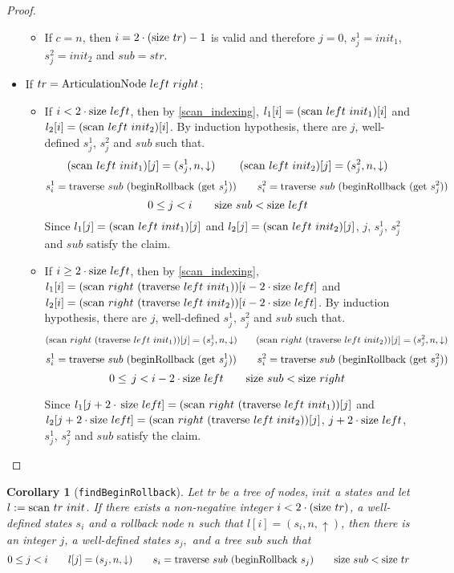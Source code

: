 \documentclass{article}
\newtheorem{corollary}[lemma]{Corollary}
\newcommand{\textfun}[1]{\textup{#1}}
\newcommand{\textcode}[1]{\texttt{#1}}
\newcommand{\artNode}[2]{\textfun{ArticulationNode}\ #1\ #2}
\newcommand{\traverse}[2]{\textfun{traverse}\ #1\ #2}
\newcommand{\scan}[2]{\textfun{scan}\ #1\ #2}
\newcommand{\up}{\uparrow}
\newcommand{\down}{\downarrow}
\newcommand{\beginRb}[1]{\textfun{beginRollback}\ #1}
\newcommand{\get}[1]{\textfun{get}\ #1}
\newcommand{\size}[1]{\textfun{size}\ #1}
\begin{document}
\begin{proof}
\begin{itemize}
\begin{itemize}
        \item If $c = n$, then  $i =  2\cdot (\size{tr}) - 1$ is valid and therefore $j = 0$, $s^1_j = init_1$, $s^2_j = init_2$ and $sub = str$.
        \end{itemize}
        \item If $tr = \artNode{left}{right}$:
        \begin{itemize}
            \item If $i < 2 \cdot \size{left}$, then by \cref{scan_indexing}, $l_1[i] = (\scan{left}{init_1})[i]$ and $l_2[i] = (\scan{left}{init_2})[i]$.
            By induction hypothesis, there are $j$, well-defined $s^1_j$, $s^2_j$ and $sub$ such that.
            \[(\scan{left}{init_1})[j] = (s^1_j, n, \down) \qquad\, (\scan{left}{init_2})[j] = (s^2_j, n, \down)\]
            \[s^1_i = \traverse{sub}{(\beginRb{(\get{s^1_j})})} \qquad s^2_i = \traverse{sub}{(\beginRb{(\get{s^2_j})})}\]
            \[0 \leq j < i \qquad \size{sub} < \size{left}\]
            Since $l_1[j] = (\scan{left}{init_1})[j]$ and $l_2[j] = (\scan{left}{init_2})[j]$, $j$, $s^1_j$, $s^2_j$ and $sub$ satisfy the claim.
            \item If $i \geq 2 \cdot \size{left}$, then by \cref{scan_indexing}, $l_1[i] = (\scan{right}{(\traverse{left}{init_1})})[i - 2 \cdot \size{left}]$ and $l_2[i] = (\scan{right}{(\traverse{left}{init_2})})[i - 2 \cdot \size{left}]$.
            By induction hypothesis, there are $j$, well-defined $s^1_j$, $s^2_j$ and $sub$ such that.
            \[(\scan{right}{(\traverse{left}{init_1})})[j] = (s^1_j, n, \down) \qquad (\scan{right}{(\traverse{left}{init_2})})[j] = (s^2_j, n, \down)\]
            \[s^1_i = \traverse{sub}{(\beginRb{(\get{s^1_j})})} \qquad s^2_i = \traverse{sub}{(\beginRb{(\get{s^2_j})})}\]
            \[ 0 \leq\, j < i - 2\cdot \size{left} \qquad \size{sub} < \size{right}\]

            Since $l_1[j + 2 \cdot\, \size{left}] = (\scan{right}{(\traverse{left}{init_1})})[j] $ and $l_2[j + 2 \cdot \size{left}] = (\scan{right}{(\traverse{left}{init_2})})[j]$, $j + 2 \cdot \size{left}$, $s^1_j$, $s^2_j$ and $sub$ satisfy the claim.
        \end{itemize}
    \end{itemize}
\end{proof}

\begin{corollary}[\textcode{findBeginRollback}]
    \label{find_begin_rb}
    Let tr be a tree of nodes, $init$ a states and let $l := \scan{tr}{init}$.
    If there exists a non-negative integer $i < 2 \cdot (\size{tr})$, a well-defined states $s_i$ and a rollback node $n$ such that 
    $l[i] = (s_i, n, \up)$, then there is an integer $j$, a well-defined states $s_j,$ and a tree $sub$ such that 
    \[0 \leq j < i \qquad l[j] = (s_j, n, \down) \qquad s_i = \traverse{sub}{(\beginRb{s_j})} \qquad \size{sub} < \size{tr}\]
\end{corollary}
\end{document}
